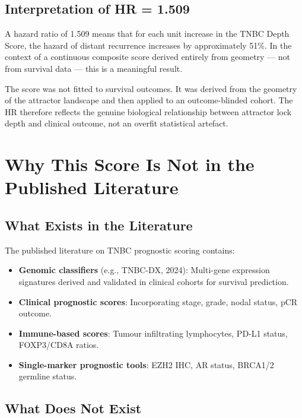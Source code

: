 \documentclass[12pt, a4paper]{article}
\begin{document}
\subsection{Interpretation of HR = 1.509}

A hazard ratio of 1.509 means that for each
unit increase in the TNBC Depth Score,
the hazard of distant recurrence increases
by approximately 51\%. In the context of
a continuous composite score derived entirely
from geometry --- not from survival data ---
this is a meaningful result.

The score was not fitted to survival outcomes.
It was derived from the geometry of the
attractor landscape and then applied to an
outcome-blinded cohort. The HR therefore
reflects the genuine biological relationship
between attractor lock depth and clinical
outcome, not an overfit statistical artefact.

\section{Why This Score Is Not in the
Published Literature}

\subsection{What Exists in the Literature}

The published literature on TNBC prognostic
scoring contains:

\begin{itemize}
    \item \textbf{Genomic classifiers} (e.g.,
    TNBC-DX, 2024): Multi-gene expression
    signatures derived and validated in clinical
    cohorts for survival prediction.

    \item \textbf{Clinical prognostic scores}:
    Incorporating stage, grade, nodal status,
    pCR outcome.

    \item \textbf{Immune-based scores}: Tumour
    infiltrating lymphocytes, PD-L1 status,
    FOXP3/CD8A ratios.

    \item \textbf{Single-marker prognostic tools}:
    EZH2 IHC, AR status, BRCA1/2 germline status.
\end{itemize}

\subsection{What Does Not Exist}
\end{document}
